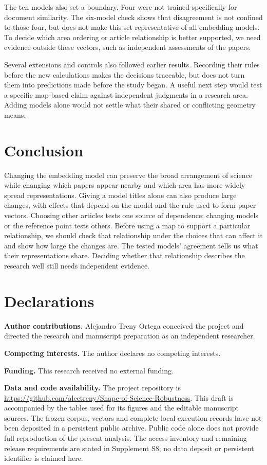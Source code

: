 \documentclass[12pt]{article}
\begin{document}
The ten models also set a boundary. Four were not trained specifically for document similarity. The six-model check shows that disagreement is not confined to those four, but does not make this set representative of all embedding models. To decide which area ordering or article relationship is better supported, we need evidence outside these vectors, such as independent assessments of the papers.

Several extensions and controls also followed earlier results. Recording their rules before the new calculations makes the decisions traceable, but does not turn them into predictions made before the study began. A useful next step would test a specific map-based claim against independent judgments in a research area. Adding models alone would not settle what their shared or conflicting geometry means.

\section{Conclusion}
Changing the embedding model can preserve the broad arrangement of science while changing which papers appear nearby and which area has more widely spread representations. Giving a model titles alone can also produce large changes, with effects that depend on the model and the rule used to form paper vectors. Choosing other articles tests one source of dependence; changing models or the reference point tests others. Before using a map to support a particular relationship, we should check that relationship under the choices that can affect it and show how large the changes are. The tested models' agreement tells us what their representations share. Deciding whether that relationship describes the research well still needs independent evidence.

\section*{Declarations}
\textbf{Author contributions.}
Alejandro Treny Ortega conceived the project and directed the research and manuscript preparation as an independent researcher.
\par\medskip
\textbf{Competing interests.}
The author declares no competing interests.
\par\medskip
\textbf{Funding.}
This research received no external funding.
\par\medskip
\textbf{Data and code availability.}
The project repository is \url{https://github.com/aleetreny/Shape-of-Science-Robustness}. This draft is accompanied by the tables used for its figures and the editable manuscript sources. The frozen corpus, vectors and complete local execution records have not been deposited in a persistent public archive. Public code alone does not provide full reproduction of the present analysis. The access inventory and remaining release requirements are stated in Supplement S8; no data deposit or persistent identifier is claimed here.


\begingroup
{}


\endgroup
\end{document}
